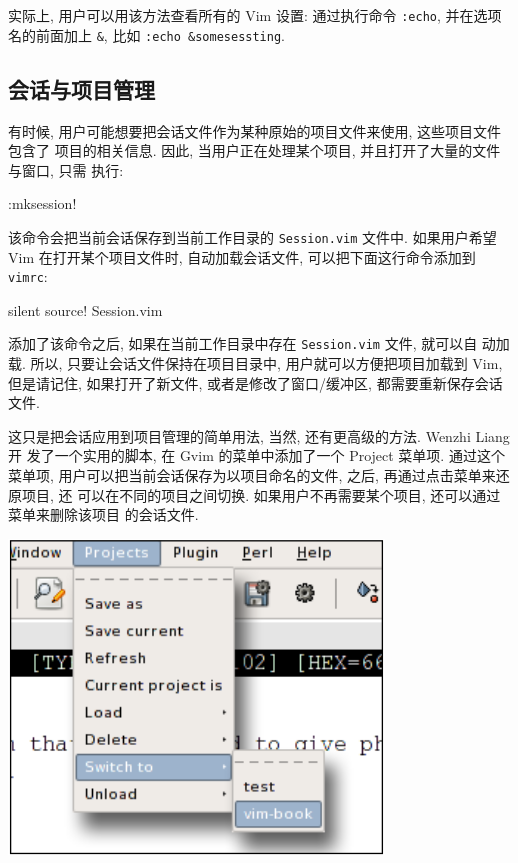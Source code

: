 \begin{warning}
    实际上, 用户可以用该方法查看所有的 Vim 设置: 通过执行命令 \texttt{:echo},
    并在选项名的前面加上 \texttt{\&}, 比如 \texttt{:echo \&somesessting}.
\end{warning}

\subsection{会话与项目管理}
\label{subsec:sessions_as_a_project_manager}

有时候, 用户可能想要把会话文件作为某种原始的项目文件来使用, 这些项目文件包含了
项目的相关信息. 因此, 当用户正在处理某个项目, 并且打开了大量的文件与窗口, 只需 
执行:
\begin{vimcode}
:mksession!
\end{vimcode}
该命令会把当前会话保存到当前工作目录的 \texttt{Session.vim} 文件中. 如果用户希望
Vim 在打开某个项目文件时, 自动加载会话文件, 可以把下面这行命令添加到
\texttt{vimrc}:
\begin{vimcode}
silent source! Session.vim
\end{vimcode}
添加了该命令之后, 如果在当前工作目录中存在 \texttt{Session.vim} 文件, 就可以自
动加载. 所以, 只要让会话文件保持在项目目录中, 用户就可以方便把项目加载到 Vim,
但是请记住, 如果打开了新文件, 或者是修改了窗口/缓冲区, 都需要重新保存会话文件.

这只是把会话应用到项目管理的简单用法, 当然, 还有更高级的方法. Wenzhi Liang 开
发了一个实用的脚本, 在 Gvim 的菜单中添加了一个 Project 菜单项. 通过这个菜单项,
用户可以把当前会话保存为以项目命名的文件, 之后, 再通过点击菜单来还原项目, 还
可以在不同的项目之间切换. 如果用户不再需要某个项目, 还可以通过菜单来删除该项目
的会话文件.
\begin{center}
    \includegraphics[scale=0.8]{./images/page98.png}
\end{center}

